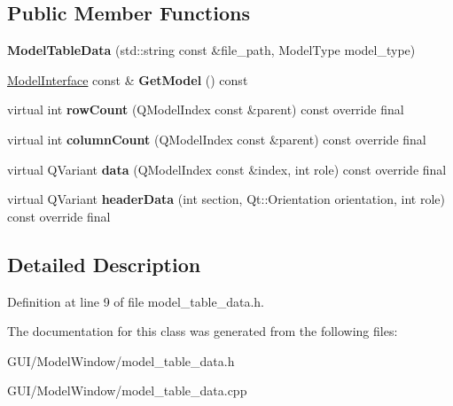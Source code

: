 \subsection*{Public Member Functions}
\begin{DoxyCompactItemize}
\item 
\mbox{\label{classModelTableData_a55b75d87fd591b326fb3deb130f2a981}} 
{\bfseries Model\+Table\+Data} (std\+::string const \&file\+\_\+path, Model\+Type model\+\_\+type)
\item 
\mbox{\label{classModelTableData_a308243742467097adafd04b59fbc9abe}} 
\hyperlink{classModelInterface}{Model\+Interface} const  \& {\bfseries Get\+Model} () const
\item 
\mbox{\label{classModelTableData_ad74b4571c5eb8bf2f84d16392f0885a8}} 
virtual int {\bfseries row\+Count} (Q\+Model\+Index const \&parent) const override final
\item 
\mbox{\label{classModelTableData_a269f93a13692b67fe9513433b02ec1ef}} 
virtual int {\bfseries column\+Count} (Q\+Model\+Index const \&parent) const override final
\item 
\mbox{\label{classModelTableData_a8e9e7be0b67bdefc68b5fe6b05c38acf}} 
virtual Q\+Variant {\bfseries data} (Q\+Model\+Index const \&index, int role) const override final
\item 
\mbox{\label{classModelTableData_a86985a36d748a7cf35302d8a0c63752a}} 
virtual Q\+Variant {\bfseries header\+Data} (int section, Qt\+::\+Orientation orientation, int role) const override final
\end{DoxyCompactItemize}


\subsection{Detailed Description}


Definition at line 9 of file model\+\_\+table\+\_\+data.\+h.



The documentation for this class was generated from the following files\+:\begin{DoxyCompactItemize}
\item 
G\+U\+I/\+Model\+Window/model\+\_\+table\+\_\+data.\+h\item 
G\+U\+I/\+Model\+Window/model\+\_\+table\+\_\+data.\+cpp\end{DoxyCompactItemize}
